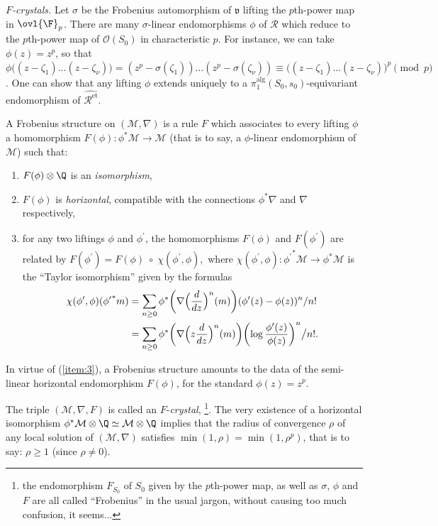 \begin{para}\label{para:f-cris}
 {\itshape $F$-crystals.}  Let $\sigma$ be the Frobenius automorphism of
 $\mathfrak{v}$ lifting the $p$th-power map in $\ovl{\F}_p$. There
 are many $\sigma$-linear endomorphisms $\phi$ of $\mathcal{R}$ which reduce
 to the $p$th-power map of $\mathcal{O}(S_0)$ in characteristic
 $p$. For instance, we can take $\phi(z) = z^p$, so that
 $\phi\bigl((z-\zeta_1)\ldots (z-\zeta_{\nu})\bigr) =
 (z^p-\sigma(\zeta_1))\ldots
 (z^p-\sigma(\zeta_{\nu})) \equiv
 \bigl((z-\zeta_1)\ldots (z-\zeta_{\nu})\bigr)^p
 \pmod{p}$. One can show that any lifting $\phi$ extends uniquely to a 
 $\pi_1^{\mathrm{alg}}(S_0,s_0)$-equivariant endomorphism of
 $\widehat{\mathcal{R}^{\mathrm{et}}}$.

 A Frobenius structure on $(\mathcal{M},\nabla)$ is a rule $F$ which
 associates to every lifting $\phi$ a homomorphism $F(\phi):
 \phi^{\ast}\mathcal{M} \rightarrow \mathcal{M}$ (that is to say, a
 $\phi$-linear endomorphism of $\mathcal{M}$) such that:

\begin{enumerate}
 \item $F(\phi)\otimes \Q$ is an \emph{isomorphism},
 \item $F(\phi)$ is \emph{horizontal}, \ie compatible with
       the connections
       $\phi^{\ast}\nabla$ and $\nabla$ respectively,
 \item for any two liftings $\phi$ and $\phi^{\prime}$, the
       homomorphisms $F(\phi)$ and
       $F(\phi^{\prime})$ are related by $F(\phi^{\prime}) = F(\phi)\; \circ
       \;\chi(\phi^{\prime},\phi),$ where
       $\chi(\phi^{\prime},\phi): {\phi^{\prime}}^{\ast}\mathcal{M} \rightarrow
       \phi^{\ast}\mathcal{M} $ is
       the ``Taylor isomorphism'' given by the formulas
       \begin{align*}
	\chi(\phi^{\prime},\phi)({\phi^{\prime}}^{\ast}m) & =
	 \sum_{n\geq 0}{\phi}^{\ast}
	\biggl(\nabla \Bigl(\frac{d}{dz}\Bigr)^n(m)\biggr)
	 ({\phi^{\prime}}(z)-{\phi}(z))^n/n!\\
	& = \sum_{n\geq 0}{\phi}^{\ast} 
	 \biggl(\nabla \Bigl(z\frac{d}{dz}\Bigr)^n(m)\biggr)
	 \biggl(\log\frac{{\phi^{\prime}}(z)}{{\phi}(z)}\biggr)^n\big/n!.
       \end{align*}\label{item:3}
\end{enumerate} 

In virtue of (\ref{item:3}), a Frobenius structure amounts to the data of
the semi-linear horizontal endomorphism $F(\phi)$, for the standard
$\phi(z) = z^p$.

\noindent
The triple $(\mathcal{M},\nabla, F)$ is
called an $F$-{\it crystal}, \cf \cite{tdd}\footnote{the endomorphism
$F_{S_0}$ of $S_0$ given by the $p$th-power map, as well as $\sigma$, $\phi$
and $F$ are all called ``Frobenius'' in the usual jargon, without
causing too much confusion, it seems... }.  The very existence of a
horizontal isomorphism $\phi^{\ast}\mathcal{M}\otimes {\Q} \simeq
\mathcal{M} \otimes {\Q}$ implies that the radius of convergence
${\rho}$ of any local solution of $(\mathcal{M},\nabla)$ satisfies
$\min(1,{\rho})=\min(1,{\rho}^p)$, that is to say: ${\rho}\geq 1$ (since
${\rho}\neq 0$).
\end{para}

